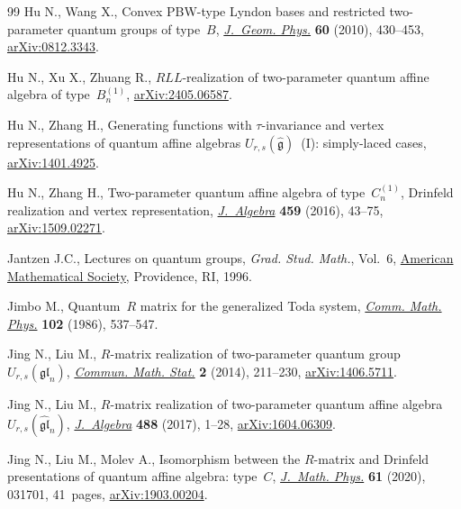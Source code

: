 \documentclass[pdftex]{sigma}
\numberwithin{equation}{section}
\begin{document}
\begin{thebibliography}{99}
Hu N., Wang X., Convex {PBW}-type {L}yndon bases and restricted two-parameter
 quantum groups of type~{$B$},
 \href{https://doi.org/10.1016/j.geomphys.2009.11.005}{\textit{J.~Geom.
 Phys.}} \textbf{60} (2010), 430--453,
 \href{http://arxiv.org/abs/0812.3343}{arXiv:0812.3343}.

Hu N., Xu X., Zhuang R., $RLL$-realization of two-parameter quantum affine
 algebra of type~$B^{(1)}_n$,
 \href{http://arxiv.org/abs/2405.06587}{arXiv:2405.06587}.

Hu N., Zhang H., Generating functions with $\tau$-invariance and vertex
 representations of quantum affine algebras
 $U_{r,s}(\widehat{\mathfrak{g}})$~(I): simply-laced cases,
 \href{http://arxiv.org/abs/1401.4925}{arXiv:1401.4925}.

Hu N., Zhang H., Two-parameter quantum affine algebra of type~{$C^{(1)}_n$},
 {D}rinfeld realization and vertex representation,
 \href{https://doi.org/10.1016/j.jalgebra.2016.03.031}{\textit{J.~Algebra}}
 \textbf{459} (2016), 43--75,
 \href{http://arxiv.org/abs/1509.02271}{arXiv:1509.02271}.

Jantzen J.C., Lectures on quantum groups, \textit{Grad. Stud. Math.}, Vol.~6,
 \href{https://doi.org/10.1090/gsm/006}{American Mathematical Society},
 Providence, RI, 1996.

Jimbo M., Quantum~{$R$} matrix for the generalized {T}oda system,
 \href{https://doi.org/10.1007/BF01221646}{\textit{Comm. Math. Phys.}}
 \textbf{102} (1986), 537--547.

Jing N., Liu M., {$R$}-matrix realization of two-parameter quantum
 group~{$U_{r,s}(\mathfrak{gl}_n)$},
 \href{https://doi.org/10.1007/s40304-014-0037-7}{\textit{Commun. Math.
 Stat.}} \textbf{2} (2014), 211--230,
 \href{http://arxiv.org/abs/1406.5711}{arXiv:1406.5711}.

Jing N., Liu M., $R$-matrix realization of two-parameter quantum affine
 algebra~{$U_{r,s}(\widehat{\mathfrak{gl}}_n)$},
 \href{https://doi.org/10.1016/j.jalgebra.2017.05.028}{\textit{J.~Algebra}}
 \textbf{488} (2017), 1--28,
 \href{http://arxiv.org/abs/1604.06309}{arXiv:1604.06309}.

Jing N., Liu M., Molev A., Isomorphism between the {$R$}-matrix and {D}rinfeld
 presentations of quantum affine algebra: type~{$C$},
 \href{https://doi.org/10.1063/1.5133854}{\textit{J.~Math. Phys.}} \textbf{61}
 (2020), 031701, 41~pages,
 \href{http://arxiv.org/abs/1903.00204}{arXiv:1903.00204}.


\end{thebibliography}
\end{document}
